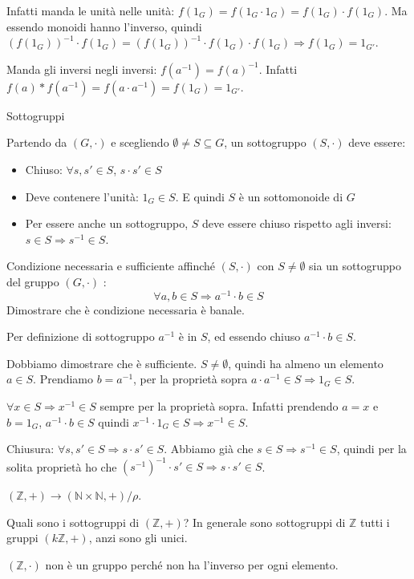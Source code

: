Infatti manda le unit\`a nelle unit\`a: $f(1_G) = f(1_G \cdot 1_G) = f(1_G) \cdot f(1_G)$. Ma essendo monoidi hanno l'inverso, quindi $(f(1_G))^{-1} \cdot f(1_G) = (f(1_G))^{-1} \cdot f(1_G) \cdot f(1_G) \Rightarrow f(1_G) = 1_{G'}$.

Manda gli inversi negli inversi: $f(a^{-1}) = f(a)^{-1}$. Infatti $f(a) \ast f(a^{-1}) = f(a \cdot a^{-1}) = f(1_G) = 1_{G'}$.

Sottogruppi

Partendo da $(G, \cdot)$ e scegliendo $\emptyset \neq S \subseteq G$, un sottogruppo $(S, \cdot)$ deve essere:
\begin{itemize}
    \item Chiuso: $\forall s, s' \in S$, $s \cdot s' \in S$
    \item Deve contenere l'unit\`a: $1_G \in S$. E quindi $S$ \`e un sottomonoide di $G$
    \item Per essere anche un sottogruppo, $S$ deve essere chiuso rispetto agli inversi: $s \in S \Rightarrow s^{-1} \in S$.
\end{itemize}
Condizione necessaria e sufficiente affinch\'e $(S, \cdot)$ con $S \neq \emptyset$ sia un sottogruppo del gruppo $(G, \cdot)$ :
\[
\forall a, b \in S \Rightarrow a^{-1} \cdot  b \in S
\]
Dimostrare che \`e condizione necessaria \`e banale. 

Per definizione di sottogruppo $a^{-1}$ \`e in $S$, ed essendo chiuso $a^{-1} \cdot b \in S$.

Dobbiamo dimostrare che \`e sufficiente. $S \neq \emptyset$, quindi ha almeno un elemento $a \in S$. Prendiamo $b = a^{-1} $, per la propriet\`a sopra $a \cdot a^{-1} \in S \Rightarrow 1_G \in S$.

$\forall x \in S \Rightarrow x^{-1} \in S$ sempre per la propriet\`a sopra. Infatti prendendo $a = x$ e $b = 1_G$, $a^{-1} \cdot b \in S$ quindi $x^{-1} \cdot 1_G \in S \Rightarrow x^{-1} \in S$.

Chiusura: $\forall s, s' \in S \Rightarrow s \cdot s' \in S$. Abbiamo gi\`a che $s \in S \Rightarrow s^{-1} \in S$, quindi per la solita propriet\`a ho che $(s^{-1})^{-1} \cdot s' \in S \Rightarrow s \cdot s' \in S$.

$(\mathbb{Z}, +) \to (\mathbb{N} \times \mathbb{N}, +) / \rho$.

Quali sono i sottogruppi di $(\mathbb{Z}, +)$? In generale sono sottogruppi di $\mathbb{Z}$ tutti i gruppi $(k \mathbb{Z}, +)$, anzi sono gli unici.

$(\mathbb{Z}, \cdot)$ non \`e un gruppo perch\'e non ha l'inverso per ogni elemento.

